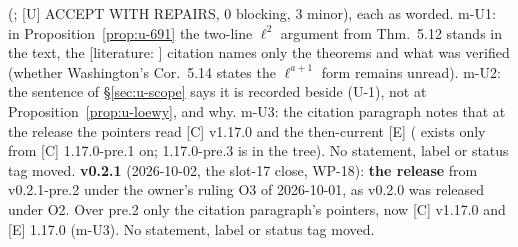 \documentclass[11pt]{article}
\newcommand{\LIT}[1]{\textsf{[literature: #1]}}   %
\begin{document}
(; [U] ACCEPT WITH REPAIRS, $0$ blocking, $3$ minor), each as worded. m-U1: in Proposition~\ref{prop:u-691} the
two-line $\ell^{2}$ argument from Thm.~5.12 stands in the text, the \LIT{} citation names only the theorems and what was verified (whether Washington's Cor.~5.14
states the $\ell^{a+1}$ form remains unread). m-U2: the \COMP{} sentence of \S\ref{sec:u-scope} says it is recorded beside (U-1), not at
Proposition~\ref{prop:u-loewy}, and why. m-U3: the citation paragraph notes that at the release the pointers read [C] v1.17.0 and the then-current [E]
( exists only from [C] 1.17.0-pre.1 on; 1.17.0-pre.3 is in the tree). No statement, label or status tag moved.
\textbf{v0.2.1} (2026-10-02, the slot-17 close, WP-18): \textbf{the release} from v0.2.1-pre.2 under the owner's ruling O3 of 2026-10-01, as v0.2.0 was released
under O2. Over pre.2 only the citation paragraph's pointers, now [C] v1.17.0 and [E] 1.17.0 (m-U3). No statement, label or status tag moved.
\end{document}
